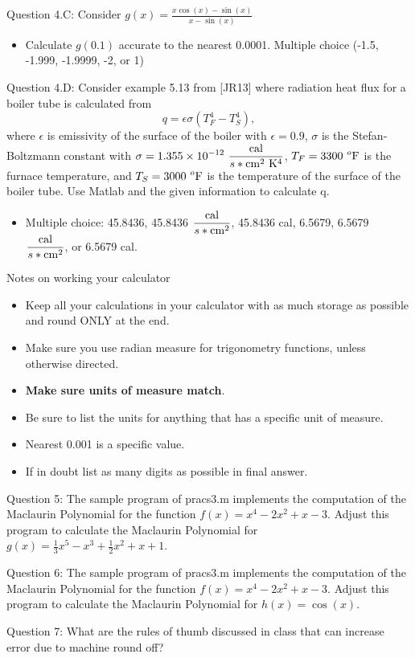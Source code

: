 \documentclass{article}
\renewcommand{\cite}[1]{[#1]}
\def\ds{\displaystyle}
\begin{document}
Question 4.C: Consider $\ds g(x) = \frac {x\cos(x) - \sin(x)}{x-\sin (x)}$
\begin{itemize}
    \item Calculate $g(0.1)$ accurate to the nearest 0.0001. Multiple choice (-1.5, -1.999, -1.9999, -2, or 1)
\end{itemize}
\par \medskip \noindent
Question 4.D: Consider example 5.13 from \cite{JR13} where radiation heat flux for a boiler tube is calculated from
$$q = \epsilon  \sigma (T^4_F - T^4_S),$$
where $\epsilon$ is emissivity of the surface of the boiler with $\epsilon = 0.9$, $\sigma$ is the Stefan-Boltzmann constant with $\ds \sigma = 1.355 \times 10^{-12} \ \frac {{\rm cal}}{s*{\rm cm}^2 \ {\rm K}^4}$, $\ds T_F = 3300 \ ^o{\rm F}$ is the furnace temperature, and $\ds T_S = 3000 \ ^o{\rm F}$ is the temperature of the surface of the boiler tube. Use Matlab and the given information to calculate q. 
\begin{itemize}
    \item Multiple choice: 45.8436, 45.8436 $\ds \frac {{\rm cal}}{s*{\rm cm}^2} $, 45.8436 cal, 6.5679, 6.5679 $\ds \frac {{\rm cal}}{s*{\rm cm}^2} $, or 6.5679 cal. 
\end{itemize}
\par \medskip \noindent
Notes on working your calculator
\begin{itemize}
    \item Keep all your calculations in your calculator with as much storage as possible and round ONLY at the end.
    \item Make sure you use radian measure for trigonometry functions, unless otherwise directed.
    \item {\bf Make sure units of measure match}.
    \item Be sure to list the units for anything that has a specific unit of measure.
    \item Nearest 0.001 is a specific value. 
    \item If in doubt list as many digits as possible in final answer. 
\end{itemize} \par \medskip \noindent
Question 5: The sample program of pracs3.m implements the computation of the Maclaurin Polynomial
for the function $\ds f(x) = x^4-2x^2+x-3$. Adjust this program to calculate the Maclaurin Polynomial for $\ds g(x)=\frac 13 x^5 - x^3+\frac 12 x^2 + x +1$.  
\medskip \par \noindent
%
Question 6: The sample program of pracs3.m implements the computation of the Maclaurin Polynomial for the function $\ds f(x) = x^4-2x^2+x-3$. Adjust this program to calculate the Maclaurin Polynomial for $h(x) = \cos (x)$.
\medskip \par \noindent
%
Question 7: What are the rules of thumb discussed in class that can increase error due to machine round off? 
\end{document}
